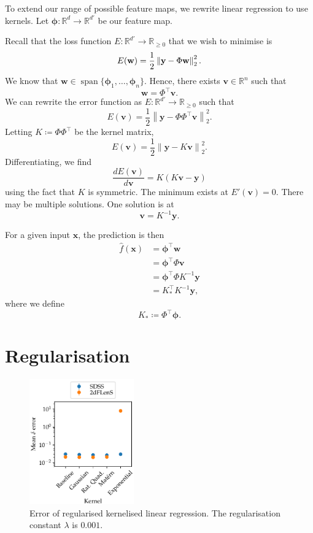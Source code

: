 \documentclass[11pt,twoside,openright]{report}
\newcommand\bphi{\bm{\phi}}
\newcommand\bbR{\mathbb{R}}
\newcommand\bv{\mathbf{v}}
\newcommand\bw{\mathbf{w}}
\newcommand\bx{\mathbf{x}}
\newcommand\by{\mathbf{y}}
\newcommand\norm[1]{\left\|#1\right\|}
\DeclareMathOperator{\spn}{span}
\begin{document}
To extend our range of possible feature maps, we rewrite linear regression to use kernels. Let $\bphi : \bbR^{d} \to \bbR^{d'}$ be our feature map.

Recall that the loss function $E : \bbR^{d'} \to \bbR_{\geq0}$ that we wish to minimise is \[
    E(\bw) = \frac{1}{2}\norm{\by - \Phi\bw}_2^2 \text.
\] We know that $\bw \in \spn\{\bphi_1, \dots, \bphi_n\}$. Hence, there exists $\bv \in \bbR^n$ such that \[
    \bw = \Phi^\top\bv \text{.}
\] We can rewrite the error function as $E : \bbR^{d'} \to \bbR_{\geq0}$ such that \[
    E(\bv) = \frac{1}{2}\norm{\by - \Phi\Phi^\top\bv}_2^2 \text{.}
\] Letting $K \coloneqq \Phi\Phi^\top$ be the kernel matrix,\[
    E(\bv) = \frac{1}{2}\norm{\by - K\bv}_2^2\text{.}
\] Differentiating, we find \[
    \frac{dE(\bv)}{d\bv} = K(K\bv - \by)
\] using the fact that $K$ is symmetric. The minimum exists at $E'(\bv) = 0$. There may be multiple solutions. One solution is at \[
    \bv = K^{-1}\by \text{.}
\]

For a given input $\bx$, the prediction is then \begin{align*}
    \hat f(\bx) &= \bphi^\top \bw \\
    &= \bphi^\top \Phi \bv \\
    &= \bphi^\top \Phi K^{-1}\by \\
    &= K_*^\top K^{-1}\by \text{,}
\end{align*} where we define \[
    K_* \coloneqq \Phi^\top\bphi \text{.}
\]

\section{Regularisation}

  \begin{figure}
    \centering
    \includegraphics[width=0.4\textwidth]{linreg_kernelised_regularised.pdf}
    \caption{Error of regularised kernelised linear regression. The regularisation constant $\lambda$ is $0.001$.}
    \label{fig:linreg_kernelised_regularised}
  \end{figure}
\end{document}
